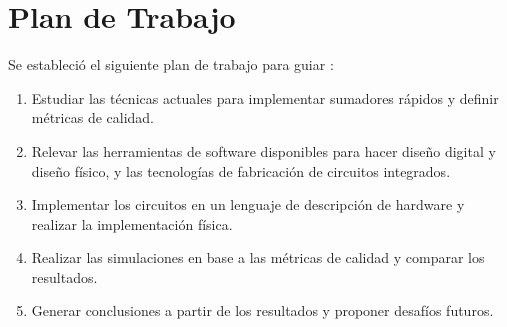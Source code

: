 \section{Plan de Trabajo}
Se estableció el siguiente plan de trabajo para guiar :
\begin{enumerate}
\item Estudiar las técnicas actuales para implementar sumadores rápidos y definir métricas de calidad.
\item Relevar las herramientas de software disponibles para hacer diseño digital y diseño físico, y las tecnologías de fabricación de circuitos integrados.
\item Implementar los circuitos en un lenguaje de descripción de hardware y realizar la implementación física.
\item Realizar las simulaciones en base a las métricas de calidad y comparar los resultados.
\item Generar conclusiones a partir de los resultados y proponer desafíos futuros.
\end{enumerate}


